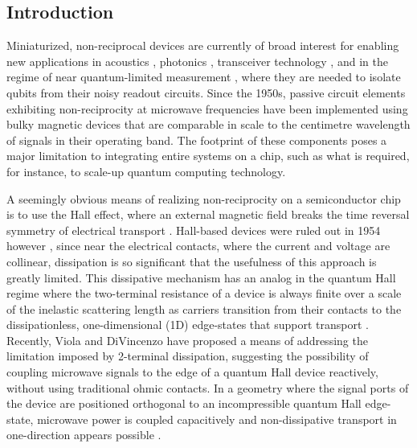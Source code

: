 \subsection{Introduction}
Miniaturized, non-reciprocal devices are currently of broad interest for enabling new applications in acoustics \cite{fleury2014sound}, photonics \cite{feng2011nonreciprocal,bi2011chip}, transceiver technology \cite{estep2014magnetic}, and in the regime of near quantum-limited measurement \cite{stace2004mesoscopic,kerckhoff2015chip,abdo2013directional,sliwa2015reconfigurable,viola2014hall}, where they are needed to isolate qubits from their noisy readout circuits.  
Since the 1950s, passive circuit elements exhibiting non-reciprocity at microwave frequencies have been implemented using bulky magnetic devices that are comparable in scale to the centimetre wavelength of signals in their operating band. The footprint of these components poses a major limitation to integrating entire systems on a chip, such as what is required, for instance, to scale-up quantum computing technology. 

A seemingly obvious means of realizing non-reciprocity on a semiconductor chip is to use the Hall effect, where an external magnetic field breaks the time reversal symmetry of electrical transport \cite{mason1953hall}. Hall-based devices were ruled out in 1954 however \cite{wick1954solution}, since near the electrical contacts, where the current and voltage are collinear, dissipation is so significant that the usefulness of this approach is greatly limited. This dissipative mechanism has an analog in the quantum Hall regime where the two-terminal resistance of a device is always finite over a scale of the inelastic scattering length as carriers transition from their contacts to the dissipationless, one-dimensional (1D) edge-states that support transport \cite{buttiker1988absence}. Recently, Viola and DiVincenzo \cite{viola2014hall} have proposed a means of addressing the limitation imposed by 2-terminal dissipation, suggesting the possibility of coupling microwave signals to the edge of a quantum Hall device reactively, without using traditional ohmic contacts. In a geometry where the signal ports of the device are positioned orthogonal to an incompressible quantum Hall edge-state, microwave power is coupled capacitively and non-dissipative transport in one-direction appears possible \cite{viola2014hall}. 

